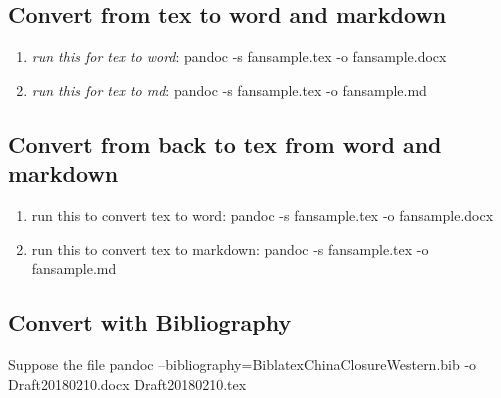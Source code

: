 \documentclass[]{article}
\begin{document}
\hypertarget{convert-from-tex-to-word-and-markdown}{%
\subsection{Convert from tex to word and
markdown}\label{convert-from-tex-to-word-and-markdown}}

\begin{enumerate}
\def\labelenumi{\arabic{enumi}.}
\item
  \emph{run this for tex to word}: pandoc -s fansample.tex -o
  fansample.docx
\item
  \emph{run this for tex to md}: pandoc -s fansample.tex -o fansample.md
\end{enumerate}

\hypertarget{convert-from-back-to-tex-from-word-and-markdown}{%
\subsection{Convert from back to tex from word and
markdown}\label{convert-from-back-to-tex-from-word-and-markdown}}

\begin{enumerate}
\def\labelenumi{\arabic{enumi}.}
\item
  run this to convert tex to word: pandoc -s fansample.tex -o
  fansample.docx
\item
  run this to convert tex to markdown: pandoc -s fansample.tex -o
  fansample.md
\end{enumerate}

\hypertarget{convert-with-bibliography}{%
\subsection{Convert with Bibliography}\label{convert-with-bibliography}}

Suppose the file pandoc --bibliography=BiblatexChinaClosureWestern.bib
-o Draft20180210.docx Draft20180210.tex
\end{document}
